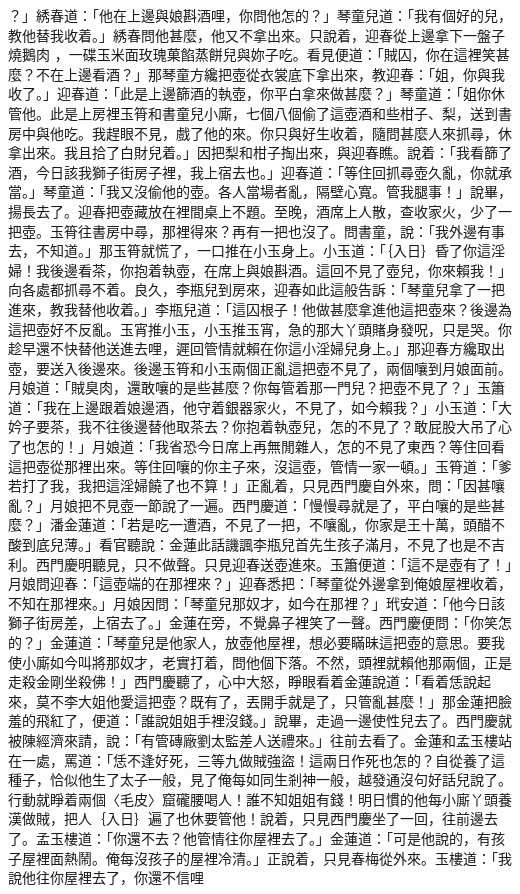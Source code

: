？」綉春道：「他在上邊與娘斟酒哩，你問他怎的？」琴童兒道：「我有個好的兒，教他替我收着。」綉春問他甚麼，他又不拿出來。只說着，迎春從上邊拿下一盤子燒鵝肉 ，一碟玉米面玫瑰菓餡蒸餅兒與妳子吃。看見便道：「賊囚，你在這裡笑甚麼？不在上邊看酒？」那琴童方纔把壺從衣裳底下拿出來，教迎春：「姐，你與我收了。」迎春道：「此是上邊篩酒的執壺，你平白拿來做甚麼？」琴童道：「姐你休管他。此是上房裡玉筲和書童兒小廝，七個八個偷了這壺酒和些柑子、梨，送到書房中與他吃。我趕眼不見，戲了他的來。你只與好生收着，隨問甚麼人來抓尋，休拿出來。我且拾了白財兒着。」因把梨和柑子掏出來，與迎春瞧。說着：「我看篩了酒，今日該我獅子街房子裡，我上宿去也。」迎春道：「等住回抓尋壺久亂，你就承當。」琴童道：「我又沒偷他的壺。各人當場者亂，隔壁心寬。管我腿事！」說畢，揚長去了。迎春把壺藏放在裡間桌上不題。至晚，酒席上人散，查收家火，少了一把壺。玉筲往書房中尋，那裡得來？再有一把也沒了。問書童，說：「我外邊有事去，不知道。」那玉筲就慌了，一口推在小玉身上。小玉道：「｛入日｝昏了你這淫婦！我後邊看茶，你抱着執壺，在席上與娘斟酒。這回不見了壺兒，你來賴我！」向各處都抓尋不着。良久，李瓶兒到房來，迎春如此這般告訴：「琴童兒拿了一把進來，教我替他收着。」李瓶兒道：「這囚根子！他做甚麼拿進他這把壺來？後邊為這把壺好不反亂。玉宵推小玉，小玉推玉宵，急的那大丫頭賭身發呪，只是哭。你趁早還不快替他送進去哩，遲回管情就賴在你這小淫婦兒身上。」那迎春方纔取出壺，要送入後邊來。後邊玉筲和小玉兩個正亂這把壺不見了，兩個嚷到月娘面前。月娘道：「賊臭肉，還敢嚷的是些甚麼？你每管着那一門兒？把壺不見了？」玉簫道：「我在上邊跟着娘邊酒，他守着銀器家火，不見了，如今賴我？」小玉道：「大妗子要茶，我不往後邊替他取茶去？你抱着執壺兒，怎的不見了？敢屁股大吊了心了也怎的！」月娘道：「我省恐今日席上再無閒雜人，怎的不見了東西？等住回看這把壺從那裡出來。等住回嚷的你主子來，沒這壺，管情一家一頓。」玉筲道：「爹若打了我，我把這淫婦饒了也不算！」正亂着，只見西門慶自外來，問：「因甚嚷亂？」月娘把不見壺一節說了一遍。西門慶道：「慢慢尋就是了，平白嚷的是些甚麼？」潘金蓮道：「若是吃一遭酒，不見了一把，不嚷亂，你家是王十萬，頭醋不酸到底兒薄。」看官聽說：金蓮此話譏諷李瓶兒首先生孩子滿月，不見了也是不吉利。西門慶明聽見，只不做聲。只見迎春送壺進來。玉簫便道：「這不是壺有了！」月娘問迎春：「這壺端的在那裡來？」迎春悉把：「琴童從外邊拿到俺娘屋裡收着，不知在那裡來。」月娘因問：「琴童兒那奴才，如今在那裡？」玳安道：「他今日該獅子街房差，上宿去了。」金蓮在旁，不覺鼻子裡笑了一聲。西門慶便問：「你笑怎的？」金蓮道：「琴童兒是他家人，放壺他屋裡，想必要瞞昧這把壺的意思。要我使小廝如今叫將那奴才，老實打着，問他個下落。不然，頭裡就賴他那兩個，正是走殺金剛坐殺佛！」西門慶聽了，心中大怒，睜眼看着金蓮說道：「看着恁說起來，莫不李大姐他愛這把壺？既有了，丟開手就是了，只管亂甚麼！」那金蓮把臉羞的飛紅了，便道：「誰說姐姐手裡沒錢。」說畢，走過一邊使性兒去了。西門慶就被陳經濟來請，說：「有管磚廠劉太監差人送禮來。」往前去看了。金蓮和孟玉樓站在一處，罵道：「恁不逢好死，三等九做賊強盜！這兩日作死也怎的？自從養了這種子，恰似他生了太子一般，見了俺每如同生剎神一般，越發通沒句好話兒說了。行動就睜着兩個〈毛皮〉窟礲腰喝人！誰不知姐姐有錢！明日慣的他每小廝丫頭養漢做賊，把人｛入日｝遍了也休要管他！說着，只見西門慶坐了一回，往前邊去了。孟玉樓道：「你還不去？他管情往你屋裡去了。」金蓮道：「可是他說的，有孩子屋裡面熱鬧。俺每沒孩子的屋裡冷清。」正說着，只見春梅從外來。玉樓道：「我說他往你屋裡去了，你還不信哩